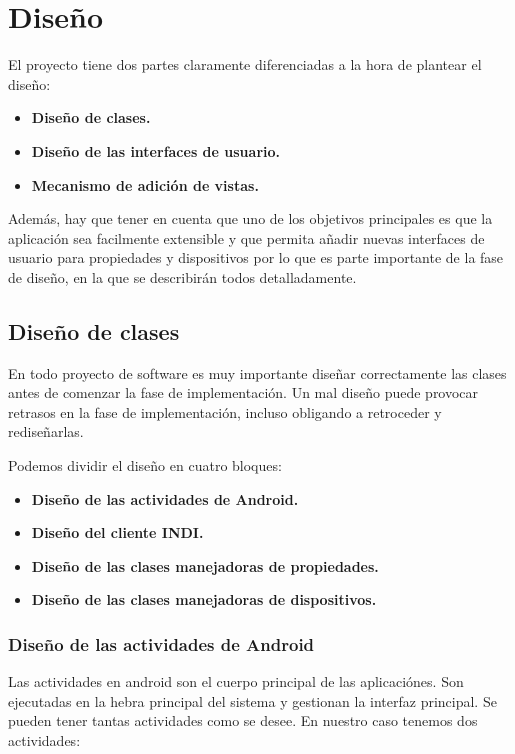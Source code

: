 \chapter{Diseño}

El proyecto tiene dos partes claramente diferenciadas a la hora de plantear el diseño:

\begin{itemize}
  \item \textbf{Diseño de clases.}
  \item \textbf{Diseño de las interfaces de usuario.}
  \item \textbf{Mecanismo de adición de vistas.}
\end{itemize}

Además, hay que tener en cuenta que uno de los objetivos principales es que la aplicación sea facilmente extensible y que permita añadir nuevas interfaces de usuario para propiedades y dispositivos por lo que es parte importante de la fase de diseño, en la que se describirán todos detalladamente.

\bigskip
\section{Diseño de clases}

En todo proyecto de software es muy importante diseñar correctamente las clases antes de comenzar la fase de implementación. Un mal diseño puede provocar retrasos en la fase de implementación, incluso obligando a retroceder y rediseñarlas.

\bigskip
Podemos dividir el diseño en cuatro bloques:

\begin{itemize}
  \item \textbf{Diseño de las actividades de Android.}
  \item \textbf{Diseño del cliente INDI.}
  \item \textbf{Diseño de las clases manejadoras de propiedades.}
  \item \textbf{Diseño de las clases manejadoras de dispositivos.}
\end{itemize}

\newpage
\subsection{Diseño de las actividades de Android}

Las actividades en android son el cuerpo principal de las aplicaciónes. Son ejecutadas en la hebra principal del sistema y gestionan la interfaz principal. Se pueden tener tantas actividades como se desee. En nuestro caso tenemos dos actividades:


